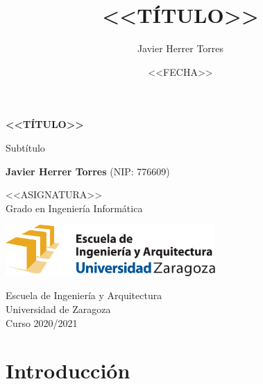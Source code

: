 \documentclass{article}
\title{<<TÍTULO>>}
\author{Javier Herrer Torres}
\date{<<FECHA>>}
\begin{document}
\begin{titlepage}
    \begin{center}
        \vspace*{1cm}
            
        \Huge
        \textbf{<<TÍTULO>>}
            
        \vspace{0.5cm}
        \LARGE
        Subtítulo
            
        \vspace{1.5cm}
            
        \textbf{Javier Herrer Torres} (NIP: 776609)
            
        \vfill
            
        <<ASIGNATURA>>\\
        Grado en Ingeniería Informática\\
            
        \vspace{1.5cm}
            
        \includegraphics[width=0.6\textwidth]{eina.pdf}
            
        \vspace{1.5cm}
            
        \Large
        Escuela de Ingeniería y Arquitectura\\
        Universidad de Zaragoza\\
        Curso 2020/2021
            
    \end{center}
\end{titlepage}

\begin{abstract}
\end{abstract}

\tableofcontents

\section{Introducción}
\end{document}
